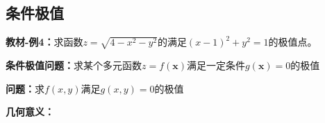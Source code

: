 \subsection{条件极值}

{\bf 教材-例4：}求函数$z=\sqrt{4-x^2-y^2}$的满足$(x-1)^2+y^2=1$的极值点。

\begin{center}
\end{center}

{\bf 条件极值问题：}求某个多元函数$z=f(\bm{x})$满足一定条件$g(\bm{x})=0$的极值

{\bf 问题：}求$f(x,y)$满足$g(x,y)=0$的极值

{\bf 几何意义：}

\begin{center}
\end{center}

